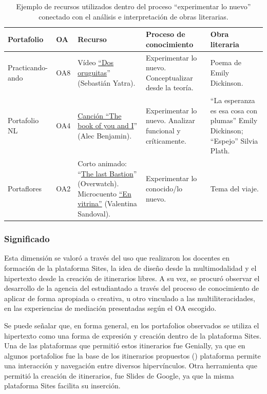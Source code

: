 \begin{table}[!htpb]
\centering
\begin{threeparttable}
\caption{Ejemplo de recursos utilizados dentro del proceso ``experimentar lo nuevo'' conectado con el análisis e interpretación de obras literarias.}
\label{tab-04}
\begin{tabular}{llp{3cm}p{3cm}p{3cm}}
\toprule
Portafolio & OA & Recurso & Proceso de conocimiento & Obra literaria \\
\midrule
Practicando-ando & OA8 & Vídeo
\href{https://youtu.be/DUGtyj5QlEM?si=_KwsI8ND0PrJCqJ3}{``Dos oruguitas}'' (Sebastián Yatra). & Experimentar lo nuevo. Conceptualizar desde la teoría. & Poema de Emily Dickinson. \\
Portafolio NL & OA4 & \href{https://sites.google.com/view/portafolio-nicolas-lagos/repertorio-de-muestras/segunda-muestra-desafíos}{Canción ``The book of you and I}'' (Alec Benjamin). & Experimentar lo nuevo. Analizar funcional y críticamente. & ``La esperanza es esa cosa con plumas'' Emily Dickinson; ``Espejo'' Silvia Plath. \\
Portaflores & OA2 & Corto animado: ``\href{https://youtu.be/to8yh83jlXg?si=rPhsC7o_mtj8rDCp}{The last Bastion}'' (Overwatch). Microcuento \href{https://santiagoen100palabras.cl/en-vitrina/}{``En vitrina''} (Valentina Sandoval). & Experimentar lo conocido/lo nuevo. & Tema del viaje. \\ 
\bottomrule
\end{tabular}
\end{threeparttable}
\end{table}
	
\subsubsection{Significado}\label{sub-sub-sec-significado}

Esta dimensión se valoró a través del uso que realizaron los docentes en
formación de la plataforma Sites, la idea de diseño desde la
multimodalidad y el hipertexto desde la creación de itinerarios libres.
A su vez, se procuró observar el desarrollo de la agencia del
estudiantado a través del proceso de conocimiento de aplicar de forma
apropiada o creativa, u otro vinculado a las multiliteracidades, en las
experiencias de mediación presentadas según el OA escogido.

Se puede señalar que, en forma general, en los portafolios observados se
utiliza el hipertexto como una forma de expresión y creación dentro de
la plataforma Sites. Una de las plataformas que permitió estos
itinerarios fue Genially, ya que en algunos portafolios fue la base de
los itinerarios propuestos () plataforma permite una
interacción y navegación entre diversos hipervínculos. Otra herramienta
que permitió la creación de itinerarios, fue Slides de Google, ya que la
misma plataforma Sites facilita su inserción.

